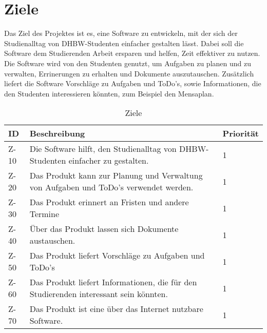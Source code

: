 
\chapter{Ziele}
Das Ziel des Projektes ist es, eine Software zu entwickeln, mit der sich der Studienalltag von DHBW-Studenten einfacher gestalten lässt. Dabei soll die Software dem Studierenden Arbeit ersparen und helfen, Zeit effektiver zu nutzen. Die Software wird von den Studenten genutzt, um  Aufgaben zu planen und zu verwalten, Errinerungen zu erhalten und Dokumente auszutauschen. Zusätzlich liefert die Software Vorschläge zu Aufgaben und ToDo's, sowie Informationen, die den Studenten interessieren könnten, zum Beispiel den Mensaplan. 

\begin{table}[H]
\caption{Ziele}
\label{ziele:entwicklungsziele}
\begin{tabularx}{\textwidth}{|l|X|l|}
\toprule
\textbf{ID} & \textbf{Beschreibung} & \textbf{Priorität}\\
\endhead
\hline
Z-10 & Die Software hilft, den Studienalltag von DHBW-Studenten einfacher zu gestalten. & 1 \\
Z-20 & Das Produkt kann zur Planung und Verwaltung von Aufgaben und ToDo's verwendet werden. & 1 \\
Z-30 & Das Produkt erinnert an Fristen und andere Termine  & 1 \\
Z-40 & Über das Produkt lassen sich Dokumente austauschen. & 1 \\
Z-50 & Das Produkt liefert Vorschläge zu Aufgaben und ToDo's & 1 \\
Z-60 & Das Produkt liefert Informationen, die für den Studierenden interessant sein könnten. & 1 \\
Z-70 & Das Produkt ist eine über das Internet nutzbare Software. & 1\\
\hline
\end{tabularx}
\end{table}

